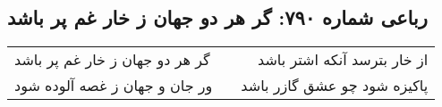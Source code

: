 \begin{center}
\section*{رباعی شماره ۷۹۰: گر هر دو جهان ز خار غم پر باشد}
\label{sec:0790}
\begin{longtable}{l p{0.5cm} r}
گر هر دو جهان ز خار غم پر باشد
&&
از خار بترسد آنکه اشتر باشد
\\
ور جان و جهان ز غصه آلوده شود
&&
پاکیزه شود چو عشق گازر باشد
\\
\end{longtable}
\end{center}
